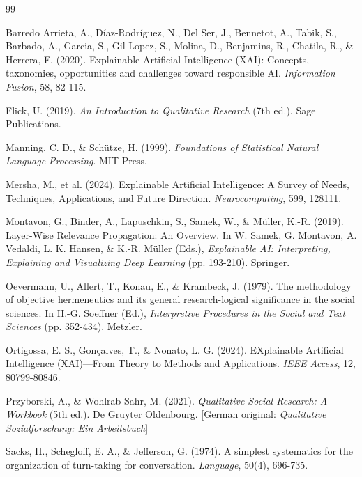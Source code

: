 \documentclass[
  12pt,
  a4paper,
  oneside,
  titlepage
]{article}
\begin{document}
\newpage
\begin{thebibliography}{99}

Barredo Arrieta, A., Díaz-Rodríguez, N., Del Ser, J., Bennetot, A., Tabik, S., 
Barbado, A., Garcia, S., Gil-Lopez, S., Molina, D., Benjamins, R., Chatila, R., 
\& Herrera, F. (2020). Explainable Artificial Intelligence (XAI): Concepts, 
taxonomies, opportunities and challenges toward responsible AI. 
\textit{Information Fusion}, 58, 82-115.

Flick, U. (2019). \textit{An Introduction to Qualitative Research} (7th ed.). 
Sage Publications.

Manning, C. D., \& Schütze, H. (1999). \textit{Foundations of Statistical Natural 
Language Processing}. MIT Press.

Mersha, M., et al. (2024). Explainable Artificial Intelligence: A Survey of Needs, 
Techniques, Applications, and Future Direction. \textit{Neurocomputing}, 599, 128111.

Montavon, G., Binder, A., Lapuschkin, S., Samek, W., \& Müller, K.-R. (2019). 
Layer-Wise Relevance Propagation: An Overview. In W. Samek, G. Montavon, 
A. Vedaldi, L. K. Hansen, \& K.-R. Müller (Eds.), \textit{Explainable AI: 
Interpreting, Explaining and Visualizing Deep Learning} (pp. 193-210). Springer.

Oevermann, U., Allert, T., Konau, E., \& Krambeck, J. (1979). The methodology of 
objective hermeneutics and its general research-logical significance in the social 
sciences. In H.-G. Soeffner (Ed.), \textit{Interpretive Procedures in the Social 
and Text Sciences} (pp. 352-434). Metzler.

Ortigossa, E. S., Gonçalves, T., \& Nonato, L. G. (2024). EXplainable Artificial 
Intelligence (XAI)—From Theory to Methods and Applications. \textit{IEEE Access}, 
12, 80799-80846.

Przyborski, A., \& Wohlrab-Sahr, M. (2021). \textit{Qualitative Social Research: 
A Workbook} (5th ed.). De Gruyter Oldenbourg. [German original: \textit{Qualitative 
Sozialforschung: Ein Arbeitsbuch}]

Sacks, H., Schegloff, E. A., \& Jefferson, G. (1974). A simplest systematics for 
the organization of turn-taking for conversation. \textit{Language}, 50(4), 696-735.


\end{thebibliography}
\end{document}
